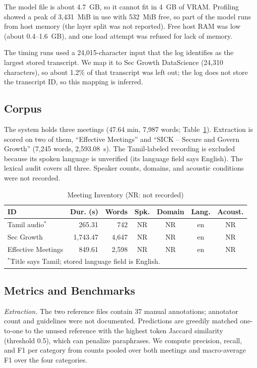 \documentclass[conference]{IEEEtran}
\begin{document}
The model file is about 4.7~GB, so it cannot fit in 4~GB of VRAM. Profiling showed a peak of 3,431~MiB in use with 532~MiB free, so part of the model runs from host memory (the layer split was not reported). Free host RAM was low (about 0.4--1.6~GB), and one load attempt was refused for lack of memory.

The timing runs used a 24,015-character input that the log identifies as the largest stored transcript. We map it to Sec Growth DataScience (24,310 characters), so about 1.2\% of that transcript was left out; the log does not store the transcript ID, so this mapping is inferred.

\subsection{Corpus}
The system holds three meetings (47.64 min, 7,987 words; Table~\ref{tab:corpus}). Extraction is scored on two of them, ``Effective Meetings'' and ``SICK -- Secure and Govern Growth'' (7,245 words, 2,593.08~s). The Tamil-labeled recording is excluded because its spoken language is unverified (its language field says English). The lexical audit covers all three. Speaker counts, domains, and acoustic conditions were not recorded.

\begin{table}[!t]
\caption{Meeting Inventory (NR: not recorded)}
\label{tab:corpus}
\centering
\footnotesize
\setlength{\tabcolsep}{3pt}
\begin{tabular}{lrrcccc}
\toprule
\textbf{ID} & \textbf{Dur. (s)} & \textbf{Words} & \textbf{Spk.} & \textbf{Domain} & \textbf{Lang.} & \textbf{Acoust.}\\
\midrule
Tamil audio$^{*}$ & 265.31 & 742 & NR & NR & en & NR\\
Sec Growth & 1,743.47 & 4,647 & NR & NR & en & NR\\
Effective Meetings & 849.61 & 2,598 & NR & NR & en & NR\\
\bottomrule
\multicolumn{7}{l}{\scriptsize $^{*}$Title says Tamil; stored language field is English.}
\end{tabular}
\end{table}

\subsection{Metrics and Benchmarks}
\emph{Extraction.} The two reference files contain 37 manual annotations; annotator count and guidelines were not documented. Predictions are greedily matched one-to-one to the unused reference with the highest token Jaccard similarity (threshold 0.5), which can penalize paraphrases. We compute precision, recall, and F1 per category from counts pooled over both meetings and macro-average F1 over the four categories.
\end{document}
